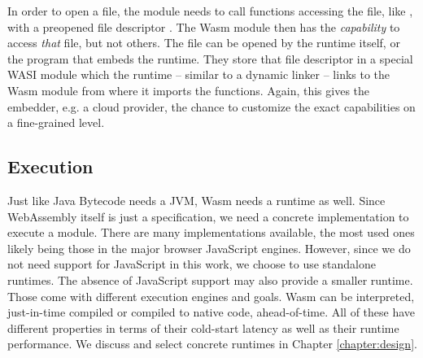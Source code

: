 In order to open a file, the module needs to call functions accessing the file, like , with a preopened file descriptor \cite{Clark2019}. The Wasm module then has the \emph{capability} to access \emph{that} file, but not others. The file can be opened by the runtime itself, or the program that embeds the runtime. They store that file descriptor in a special WASI module which the runtime -- similar to a dynamic linker -- links to the Wasm module from where it imports the functions. Again, this gives the embedder, e.g. a cloud provider, the chance to customize the exact capabilities on a fine-grained level.

\subsection{Execution}

Just like Java Bytecode needs a JVM, Wasm needs a runtime as well. Since WebAssembly itself is just a specification, we need a concrete implementation to execute a module. There are many implementations available, the most used ones likely being those in the major browser JavaScript engines. However, since we do not need support for JavaScript in this work, we choose to use standalone runtimes. The absence of JavaScript support may also provide a smaller runtime. Those come with different execution engines and goals. Wasm can be interpreted, just-in-time compiled or compiled to native code, ahead-of-time. All of these have different properties in terms of their cold-start latency as well as their runtime performance. We discuss and select concrete runtimes in Chapter \ref{chapter:design}.

